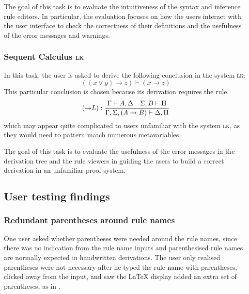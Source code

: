 The goal of this task is to evaluate the intuitiveness of the syntax and inference rule editors. In particular, the evaluation focuses on how the users interact with the user interface to check the correctness of their definitions and the usefulness of the error messages and warnings.

\subsubsection{Sequent Calculus \textsc{lk}}
In this task, the user is asked to derive the following conclusion in the system \textsc{lk}:
\[
    ((x \lor y) \to z) \vdash (x \to z)
\]
This particular conclusion is chosen because its derivation requires the rule
\[
    (\mathord{\to} L): \frac{\Gamma \vdash A, \Delta \quad \Sigma, B \vdash \Pi}{\Gamma, \Sigma, (A \rightarrow B) \vdash \Delta, \Pi}
\]
which may appear quite complicated to users unfamiliar with the system \textsc{lk}, as they would need to pattern match numerous metavariables.

The goal of this task is to evaluate the usefulness of the error messages in the derivation tree and the rule viewers in guiding the users to build a correct derivation in an unfamiliar proof system.

\subsection{User testing findings}
\subsubsection{Redundant parentheses around rule names}
One user asked whether parentheses were needed around the rule names, since there was no indication from the rule name inputs and parenthesised rule names are normally expected in handwritten derivations. The user only realised parentheses were not necessary after he typed the rule name with parentheses, clicked away from the input, and saw the \LaTeX{} display added an extra set of parentheses, as in .

